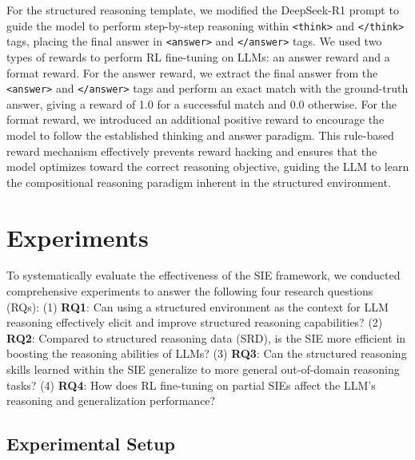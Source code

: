 \documentclass{article} %
\begin{document}
For the structured reasoning template, we modified the DeepSeek-R1 \citep{guo2025deepseek} prompt to guide the model to perform step-by-step reasoning within \texttt{<think>} and \texttt{</think>} tags, placing the final answer in \texttt{<answer>} and \texttt{</answer>} tags. We used two types of rewards to perform RL fine-tuning on LLMs: an answer reward and a format reward. For the answer reward, we extract the final answer from the \texttt{<answer>} and \texttt{</answer>} tags and perform an exact match with the ground-truth answer, giving a reward of 1.0 for a successful match and 0.0 otherwise. For the format reward, we introduced an additional positive reward to encourage the model to follow the established thinking and answer paradigm. This rule-based reward mechanism effectively prevents reward hacking and ensures that the model optimizes toward the correct reasoning objective, guiding the LLM to learn the compositional reasoning paradigm inherent in the structured environment.


\section{Experiments}
To systematically evaluate the effectiveness of the SIE framework, we conducted comprehensive experiments to answer the following four research questions (RQs): 
(1) \textbf{RQ1}: Can using a structured environment as the context for LLM reasoning effectively elicit and improve structured reasoning capabilities? 
(2) \textbf{RQ2}: Compared to structured reasoning data (SRD), is the SIE more efficient in boosting the reasoning abilities of LLMs? 
(3) \textbf{RQ3}: Can the structured reasoning skills learned within the SIE generalize to more general out-of-domain reasoning tasks? 
(4) \textbf{RQ4}: How does RL fine-tuning on partial SIEs affect the LLM's reasoning and generalization performance? 


\subsection{Experimental Setup}
\end{document}
